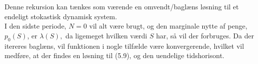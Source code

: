 Denne rekursion kan tænkes som værende en omvendt/baglæns løsning til et endeligt stokastisk dynamisk system.\\
I den sidste periode, $N=0$ vil alt være brugt, og den marginale nytte af penge, $p_0(S)$, er $\lambda(S),$ da ligemeget hvilken værdi $S$ har, så vil der forbruges. Da der itereres baglæns, vil funktionen i nogle tilfælde være konvergerende, hvilket vil medføre, at der findes en løsning til (5.9), og den uendelige tidshorisont.










